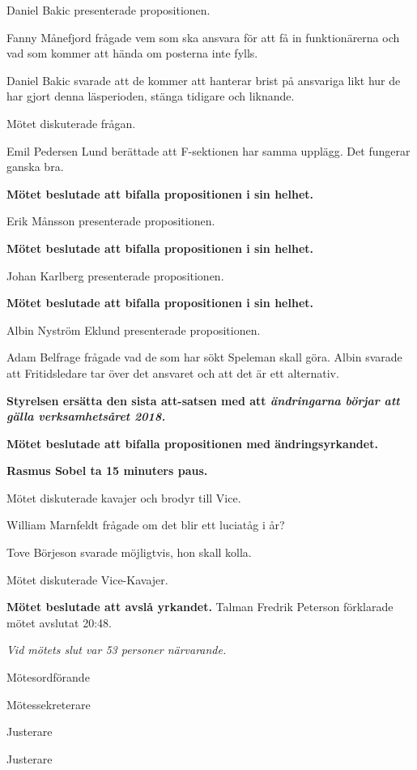 \documentclass[10pt]{article}
\def\mo{Fredrik Peterson}
\def\ms{Johan Karlberg}
\def\ji{David Uhler Brand}
\def\jii{Axel Voss}
\begin{document}
\begin{paragrafer}
\begin{paragrafer}
        Daniel Bakic presenterade propositionen.

        Fanny Månefjord frågade vem som ska ansvara för att få in funktionärerna och vad som kommer att hända om posterna inte fylls.

        Daniel Bakic svarade att de kommer att hanterar brist på ansvariga likt hur de har gjort denna läsperioden, stänga tidigare och liknande.

        Mötet diskuterade frågan.

        Emil Pedersen Lund berättade att F-sektionen har samma upplägg. Det fungerar ganska bra.

        \textbf{Mötet beslutade att bifalla propositionen i sin helhet.}

        Erik Månsson presenterade propositionen.

        \textbf{Mötet beslutade att bifalla propositionen i sin helhet.}

        Johan Karlberg presenterade propositionen.

        \textbf{Mötet beslutade att bifalla propositionen i sin helhet.}

        Albin Nyström Eklund presenterade propositionen.

        Adam Belfrage frågade vad de som har sökt Speleman skall göra. Albin svarade att Fritidsledare tar över det ansvaret och att det är ett alternativ.

        \textbf{Styrelsen \ypa ersätta den sista att-satsen med att \emph{ändringarna börjar att gälla verksamhetsåret 2018.}}

        \textbf{Mötet beslutade att bifalla propositionen med ändringsyrkandet.}

    \end{paragrafer}

\textbf{Rasmus Sobel \ypa ta 15 minuters paus.}

Mötet diskuterade kavajer och brodyr till Vice.

William Marnfeldt frågade om det blir ett luciatåg i år?

Tove Börjeson svarade möjligtvis, hon skall kolla.

Mötet diskuterade Vice-Kavajer.

\textbf{Mötet beslutade att avslå yrkandet.}
Talman {\mo} förklarade mötet avslutat 20:48.

\emph{Vid mötets slut var 53 personer närvarande.}

\end{paragrafer}

\hidesignfoot
\begin{signatures}{4}
\signature{\mo}{Mötesordförande}
\signature{\ms}{Mötessekreterare}
\signature{\ji}{Justerare}
\signature{\jii}{Justerare}
\end{signatures}
\end{document}
